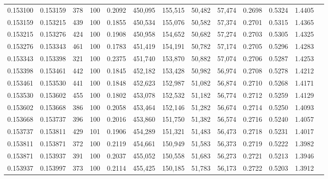 \begin{tabular}{rrrrrrrrrrrrr}
0.153100 & 0.153159 &   378 & 100 &                                     0.2092 & 450,095 & 155,515 &  50,482 &  57,474 & 0.2698 & 0.5324 & 1.4405 \\
0.153159 & 0.153215 &   439 & 100 &                                     0.1855 & 450,534 & 155,076 &  50,582 &  57,374 & 0.2701 & 0.5315 & 1.4365 \\
0.153215 & 0.153276 &   424 & 100 &                                     0.1908 & 450,958 & 154,652 &  50,682 &  57,274 & 0.2703 & 0.5305 & 1.4325 \\
0.153276 & 0.153343 &   461 & 100 &                                     0.1783 & 451,419 & 154,191 &  50,782 &  57,174 & 0.2705 & 0.5296 & 1.4283 \\
0.153343 & 0.153398 &   321 & 100 &                                     0.2375 & 451,740 & 153,870 &  50,882 &  57,074 & 0.2706 & 0.5287 & 1.4253 \\
0.153398 & 0.153461 &   442 & 100 &                                     0.1845 & 452,182 & 153,428 &  50,982 &  56,974 & 0.2708 & 0.5278 & 1.4212 \\
0.153461 & 0.153530 &   441 & 100 &                                     0.1848 & 452,623 & 152,987 &  51,082 &  56,874 & 0.2710 & 0.5268 & 1.4171 \\
0.153530 & 0.153602 &   455 & 100 &                                     0.1802 & 453,078 & 152,532 &  51,182 &  56,774 & 0.2712 & 0.5259 & 1.4129 \\
0.153602 & 0.153668 &   386 & 100 &                                     0.2058 & 453,464 & 152,146 &  51,282 &  56,674 & 0.2714 & 0.5250 & 1.4093 \\
0.153668 & 0.153737 &   396 & 100 &                                     0.2016 & 453,860 & 151,750 &  51,382 &  56,574 & 0.2716 & 0.5240 & 1.4057 \\
0.153737 & 0.153811 &   429 & 101 &                                     0.1906 & 454,289 & 151,321 &  51,483 &  56,473 & 0.2718 & 0.5231 & 1.4017 \\
0.153811 & 0.153871 &   372 & 100 &                                     0.2119 & 454,661 & 150,949 &  51,583 &  56,373 & 0.2719 & 0.5222 & 1.3982 \\
0.153871 & 0.153937 &   391 & 100 &                                     0.2037 & 455,052 & 150,558 &  51,683 &  56,273 & 0.2721 & 0.5213 & 1.3946 \\
0.153937 & 0.153997 &   373 & 100 &                                     0.2114 & 455,425 & 150,185 &  51,783 &  56,173 & 0.2722 & 0.5203 & 1.3912 \\

\end{tabular}
